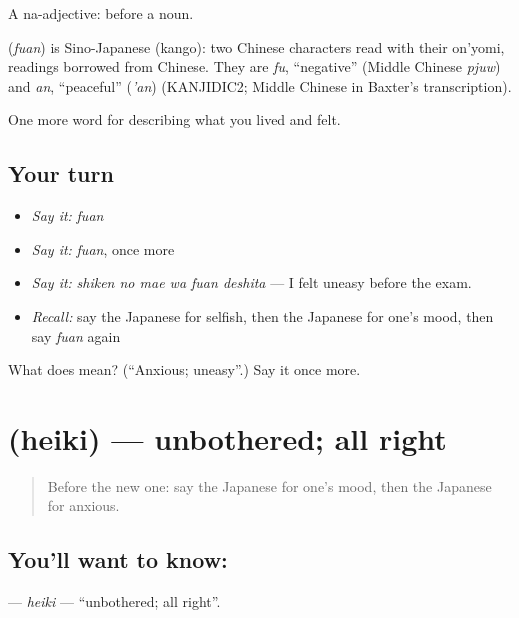 A na-adjective:  before a noun.

\begin{cousinweb}
\textbf{} (\emph{fuan}) is Sino-Japanese (kango): two Chinese characters read with their on'yomi, readings borrowed from Chinese. They are \emph{fu}, \textquotedblleft{}negative\textquotedblright{} (Middle Chinese \emph{pjuw}) and \emph{an}, \textquotedblleft{}peaceful\textquotedblright{} (\emph{'an}) (KANJIDIC2; Middle Chinese in Baxter's transcription).
\end{cousinweb}

\begin{grammarlens}[title={What you've built}]
One more word for describing what you lived and felt.
\end{grammarlens}

\subsection*{Your turn}
\begin{itemize}
\raggedright
  \item \emph{Say it:} \emph{fuan}
  \item \emph{Say it:} \emph{fuan}, once more
  \item \emph{Say it:} \emph{shiken no mae wa fuan deshita} — I felt uneasy before the exam.
  \item \emph{Recall:} say the Japanese for selfish, then the Japanese for one's mood, then say \emph{fuan} again
\end{itemize}

\begin{tcolorbox}[breakable,colback=teal!4,colframe=teal!35!black,title={Before you move on}]
What does  mean? (\textquotedblleft{}Anxious; uneasy\textquotedblright{}.) Say it once more.
\end{tcolorbox}
\section[\texorpdfstring{\ja{へいき} (heiki)}{へいき (heiki)}]{ (heiki) — unbothered; all right}

\label{lesson:JA-C426-heiki}



\begin{quote}
Before the new one: say the Japanese for one's mood, then the Japanese for anxious.
\end{quote}

\subsection*{You'll want to know: }
\textbf{} — \emph{heiki} — \textquotedblleft{}unbothered; all right\textquotedblright{}.

